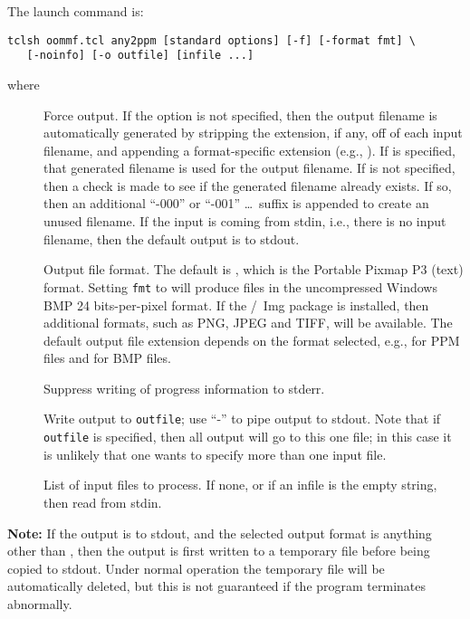 The  launch command is:
\begin{verbatim}
tclsh oommf.tcl any2ppm [standard options] [-f] [-format fmt] \
   [-noinfo] [-o outfile] [infile ...]
\end{verbatim}
where
\begin{description}
\item[]
  Force output.  If the  option is not specified, then the output
  filename is automatically generated by stripping the extension, if
  any, off of each input filename, and appending a format-specific
  extension (e.g., \fn{.ppm}).  If  is specified, that generated
  filename is used for the output filename.  If \cd{-f} is not
  specified, then a check is made to see if the generated filename
  already exists.  If so, then an additional ``-000'' or ``-001''
  \ldots\ suffix is appended to create an unused filename.  If the input
  is coming from stdin, i.e., there is no input filename, then the
  default output is to stdout.
\item[]
  Output file format.  The default is , which is the Portable
  Pixmap P3 (text) format.  Setting \texttt{fmt} to \cd{BMP} will
  produce files in the uncompressed Windows BMP\index{file!bmp} 24
  bits-per-pixel format.  If the \Tcl/\Tk\ Img package is installed,
  then additional formats, such as PNG, JPEG and TIFF, will be
  available.  The default output file extension depends on the format
  selected, e.g., \fn{.ppm} for PPM files and \fn{.bmp} for BMP files.
\item[\optkey{-noinfo}]
  Suppress writing of progress information to stderr.
\item[]
  Write output to {\tt outfile}; use ``-'' to pipe output to stdout.
  Note that if {\tt outfile} is specified, then all output will go to
  this one file; in this case it is unlikely that one wants to specify
  more than one input file.
\item[]
  List of input files to process.  If none, or if an infile is the empty
  string, then read from stdin.
\end{description}

\textbf{Note:} If the output is to stdout, and the selected output
format is anything other than \cd{PPM}, then the output is first written
to a temporary file before being copied to stdout.  Under normal
operation the temporary file will be automatically deleted, but this is
not guaranteed if the program terminates abnormally.

